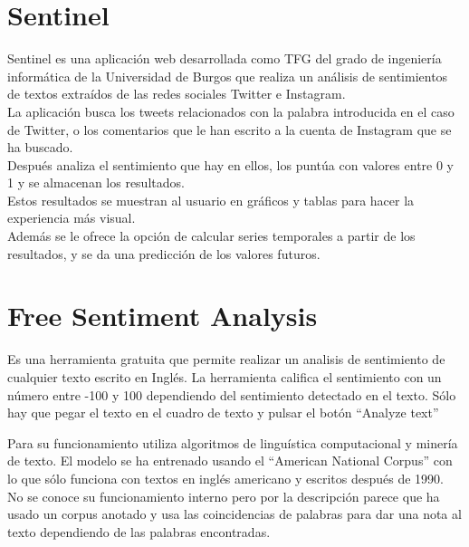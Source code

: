 \section{Sentinel~\cite{Sentinel1}}
Sentinel es una aplicación web desarrollada como TFG del grado de ingeniería 
informática de la Universidad de Burgos que realiza un análisis de sentimientos de textos 
extraídos de las redes sociales Twitter e Instagram.\\
La aplicación busca los tweets relacionados con la palabra introducida 
en el caso de Twitter, o los comentarios que le han escrito a la 
cuenta de Instagram que se ha buscado.\\
Después analiza el sentimiento que hay en ellos, los puntúa con valores entre 0 y 1 y 
se almacenan los resultados.\\
Estos resultados se muestran al usuario en gráficos 
y tablas para hacer la experiencia más visual.\\ 
Además se le ofrece la opción de calcular series temporales a partir de los resultados, 
y se da una predicción de los valores futuros.

\section{Free Sentiment Analysis~\cite{freesentiment}}
Es una herramienta gratuita que permite realizar un analisis de sentimiento de cualquier 
texto escrito en Inglés. La herramienta califica el sentimiento con un número entre -100 y 100 
dependiendo del sentimiento detectado en el texto.
Sólo hay que pegar el texto en el cuadro de texto y pulsar el botón ``Analyze text''

Para su funcionamiento utiliza algoritmos de linguística computacional y minería de texto.
El modelo se ha entrenado usando el ``American National Corpus'' con lo que sólo funciona con 
textos en inglés americano y escritos después de 1990. 
No se conoce su funcionamiento interno pero por la descripción parece que ha usado un 
corpus anotado y usa las coincidencias de palabras para dar una nota al texto dependiendo 
de las palabras encontradas.